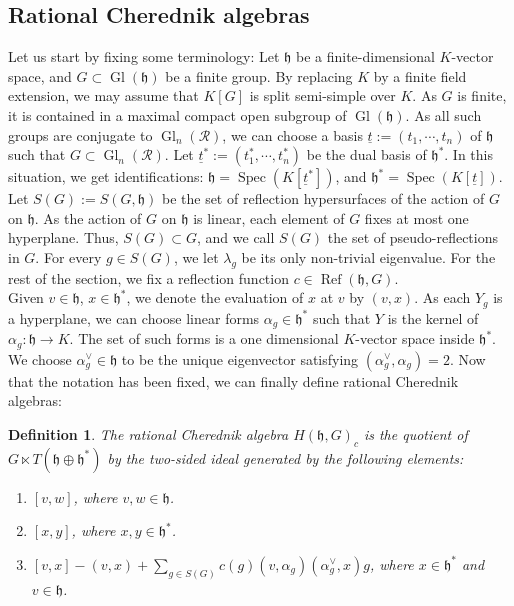 \documentclass{amsart}
\newtheorem{defi}{ Definition}[subsection]
\newcommand{\Spec}{\operatorname{Spec}}
\begin{document}
\subsection{Rational Cherednik algebras}\label{intro rational Cher algebras}
Let us start by fixing some terminology: 
Let $\mathfrak{h}$ be a finite-dimensional $K$-vector space, and $G\subset \operatorname{Gl}(\mathfrak{h})$ be a finite group. By replacing $K$ by a finite field extension, we may assume that $K[G]$ is split semi-simple over $K$. As $G$ is finite,  it is contained in a maximal compact open subgroup of $\operatorname{Gl}(\mathfrak{h})$. As all such groups are conjugate to $\operatorname{Gl}_n(\mathcal{R})$, we can choose a basis $\underline{t}:=(t_1,\cdots,t_n)$ of $\mathfrak{h}$ such that $G\subset \operatorname{Gl}_n(\mathcal{R})$. Let $\underline{t}^*:=(t_1^*,\cdots,t_n^*)$ be the dual basis of $\mathfrak{h}^*$. In this situation, we get identifications: 
$\mathfrak{h}=\Spec(K[\underline{t}^*])$, and $\mathfrak{h}^*=\Spec(K[\underline{t}])$.\\
Let $S(G):=S(G,\mathfrak{h})$ be the set of reflection hypersurfaces of the action of $G$ on $\mathfrak{h}$. As the action of $G$ on $\mathfrak{h}$ is linear, each element of $G$ fixes at most one hyperplane. Thus,  $S(G)\subset G$, and we call $S(G)$ the set of pseudo-reflections in $G$. For every $g\in S(G)$, we let $\lambda_g$ be its only non-trivial eigenvalue. For the rest of the section, we fix a reflection function $c\in \operatorname{Ref}(\mathfrak{h},G)$. \\
Given $v\in \mathfrak{h}$, $x\in \mathfrak{h}^*$, we denote the evaluation of $x$ at $v$ by $(v,x)$. As each $Y_g$ is a hyperplane, we can choose linear forms $\alpha_g\in \mathfrak{h}^*$ such that $Y$ is the kernel of $\alpha_g:\mathfrak{h}\rightarrow K$. The set of such forms is a one dimensional $K$-vector space inside $\mathfrak{h}^*$. We choose  $\alpha_g^{\vee}\in \mathfrak{h}$ to be the unique eigenvector satisfying $(\alpha_g^{\vee},\alpha_g)=2$. Now that the notation has been fixed, we can finally define rational Cherednik algebras:
\begin{defi}\label{presentation rational cherednik algebras}
 The rational Cherednik algebra $H(\mathfrak{h},G)_{c}$ is the quotient of $G\ltimes T(\mathfrak{h}\oplus \mathfrak{h}^*)$ by the two-sided ideal generated by the following elements:
\begin{enumerate}[label=(\roman*)]
    \item $[v,w]$, where $v,w\in \mathfrak{h}$.
    \item $[x,y]$, where $x,y\in \mathfrak{h}^*$.
    \item $[v,x]-(v,x)+\sum_{g\in S(G)}c(g)(v,\alpha_g)(\alpha_g^{\vee},x)g$, where $x\in\mathfrak{h}^*$ and $v\in \mathfrak{h}$.
\end{enumerate}
\end{defi}
\end{document}
